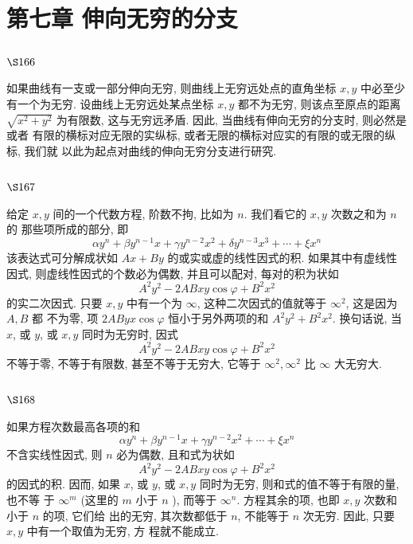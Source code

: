 \chapter{第七章 伸向无穷的分支}

\section{$\S 166$}

如果曲线有一支或一部分伸向无穷, 则曲线上无穷远处点的直角坐标 $x, y$ 中必至少 有一个为无穷. 设曲线上无穷远处某点坐标 $x, y$ 都不为无穷, 则该点至原点的距离 $\sqrt{x^{2}+y^{2}}$ 为有限数, 这与无穷远矛盾. 因此, 当曲线有伸向无穷的分支时, 则必然是或者 有限的横标对应无限的实纵标, 或者无限的横标对应实的有限的或无限的纵标, 我们就 以此为起点对曲线的伸向无穷分支进行研究.

\section{$\S 167$}

给定 $x, y$ 间的一个代数方程, 阶数不拘, 比如为 $n$. 我们看它的 $x, y$ 次数之和为 $n$ 的 那些项所成的部分, 即
\[
\alpha y^{n}+\beta y^{n-1} x+\gamma y^{n-2} x^{2}+\delta y^{n-3} x^{3}+\cdots+\xi x^{n}
\]
该表达式可分解成状如 $A x+B y$ 的或实或虚的线性因式的积. 如果其中有虚线性因式, 则虚线性因式的个数必为偶数, 并且可以配对, 每对的积为状如
\[
A^{2} y^{2}-2 A B x y \cos \varphi+B^{2} x^{2}
\]
的实二次因式. 只要 $x, y$ 中有一个为 $\infty$, 这种二次因式的值就等于 $\infty^{2}$, 这是因为 $A, B$ 都 不为零, 项 $2 A B y x \cos \varphi$ 恒小于另外两项的和 $A^{2} y^{2}+B^{2} x^{2}$. 换句话说, 当 $x$, 或 $y$, 或 $x, y$ 同时为无穷时, 因式
\[
A^{2} y^{2}-2 A B x y \cos \varphi+B^{2} x^{2}
\]
不等于零, 不等于有限数, 甚至不等于无穷大, 它等于 $\infty^{2}, \infty^{2}$ 比 $\infty$ 大无穷大.

\section{$\S 168$}

如果方程次数最高各项的和
\[
\alpha y^{n}+\beta y^{n-1} x+\gamma y^{n-2} x^{2}+\cdots+\xi x^{n}
\]
不含实线性因式, 则 $n$ 必为偶数, 且和式为状如
\[
A^{2} y^{2}-2 A B x y \cos \varphi+B^{2} x^{2}
\]
的因式的积. 因而, 如果 $x$, 或 $y$, 或 $x, y$ 同时为无穷, 则和式的值不等于有限的量, 也不等 于 $\infty^{m}$ (这里的 $m$ 小于 $n$ ), 而等于 $\infty^{n}$. 方程其余的项, 也即 $x, y$ 次数和小于 $n$ 的项, 它们给 出的无穷, 其次数都低于 $n$, 不能等于 $n$ 次无穷. 因此, 只要 $x, y$ 中有一个取值为无穷, 方 程就不能成立.

